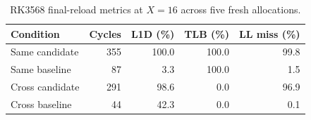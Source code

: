 \begin{table}[t]
\centering
\small
\caption{RK3568 final-reload metrics at $X=16$ across five fresh allocations.}
\label{tab:rk3568-x16-pmu}
\begin{tabular}{lrrrr}
\toprule
Condition & Cycles & L1D (\%) & TLB (\%) & LL miss (\%) \\
\midrule
Same candidate & 355 & 100.0 & 100.0 & 99.8 \\
Same baseline & 87 & 3.3 & 100.0 & 1.5 \\
Cross candidate & 291 & 98.6 & 0.0 & 96.9 \\
Cross baseline & 44 & 42.3 & 0.0 & 0.1 \\
\bottomrule
\end{tabular}
\end{table}
